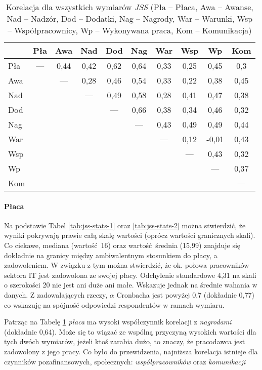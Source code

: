 \begin{table}[h!]
\begin{center}
\begin{tabular} { l | c c c c c c c c c }
 & Pła & Awa & Nad & Dod & Nag & War & Wsp & Wp & Kom \\ \hline \hline
Pła & --- & 0,44 & 0,42 & 0,62 & 0,64 & 0,33 & 0,25 & 0,45 & 0,3 \\
Awa & & --- & 0,28 & 0,46 & 0,54 & 0,33 & 0,22 & 0,38 & 0,45 \\
Nad & & & --- & 0,49 & 0,58 & 0,28 & 0,41 & 0,47 & 0,38 \\
Dod & & & & --- & 0,66 & 0,38 & 0,34 & 0,46 & 0,32 \\
Nag & & & & & --- & 0,43 & 0,49 & 0,49 & 0,44 \\
War & & & & & & --- & 0,12 & -0,01 & 0,43 \\
Wsp & & & & & & & --- & 0,43 & 0,32 \\
Wp & & & & & & & & --- & 0,37 \\
Kom & & & & & & & & & ---  \\
\end{tabular}
\end{center}
\caption[Korelacja dla wszystkich wymiarów \emph{JSS}]{Korelacja dla wszystkich wymiarów \emph{JSS} (Pła -- Płaca, Awa -- Awanse, Nad -- Nadzór, Dod -- Dodatki, Nag -- Nagrody, War -- Warunki, Wsp -- Współpracownicy, Wp -- Wykonywana praca, Kom -- Komunikacja)}
\label{tab:jss-correl}
\end{table}

\paragraph{Płaca} Na podstawie Tabel \ref{tab:jss-stats-1} oraz \ref{tab:jss-stats-2} można stwierdzić, że wyniki pokrywają prawie całą skalę wartości (oprócz wartości granicznych skali). Co ciekawe, mediana (wartość 16) oraz wartość średnia (15,99) znajduje się dokładnie na granicy między ambiwalentnym stosunkiem do płacy, a zadowoleniem. W związku z tym można stwierdzić, że ok. połowa pracowników sektora IT jest zadowolona ze swojej płacy. Odchylenie standardowe 4,31 na
skali o szerokości 20 nie jest ani duże ani małe. Wskazuje
jednak na średnie wahania w danych. Z zadowalających rzeczy, $\alpha$ Cronbacha jest powyżej 0,7 (dokładnie 0,77) co wskazuję na spójność odpowiedzi respondentów w ramach wymiaru.

Patrząc na Tabelę \ref{tab:jss-correl} \textit{płaca} ma wysoki współczynnik korelacji z \textit{nagrodami} (dokładnie 0,64). Może się to wiązać ze wspólną przyczyną wysokich wartości dla tych dwóch wymiarów, jeżeli ktoś zarabia dużo, to znaczy, że pracodawca jest zadowolony z jego pracy. Co było do przewidzenia, najniższa korelacja istnieje dla czynników pozafinansowych, społecznych: \emph{współpracowników} oraz \emph{komunikacji}

